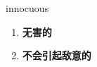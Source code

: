 
\begin{frame}
{\huge innocuous}
\begin{center}
\begin{enumerate}\Large
  \item \textbf{无害的}
  \item \textbf{不会引起敌意的}
\end{enumerate}
\end{center}
\end{frame}
